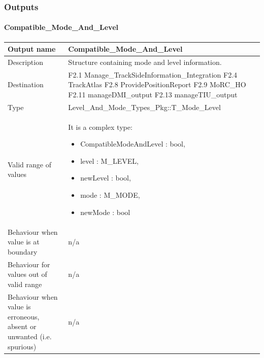 \subsubsection{Outputs}\label{s:mode_and_level_outputs}




\paragraph{Compatible\_Mode\_And\_Level}

\begin{longtable}{p{}p{}}
\toprule
Output name				& Compatible\_Mode\_And\_Level \\
\midrule
Description				& Structure containing mode and level information.  \\
\midrule
Destination				& F2.1 Manage\_TrackSideInformation\_Integration\newline
F2.4 TrackAtlas\newline
F2.8 ProvidePositionReport\newline
F2.9 MoRC\_HO\newline
F2.11 manageDMI\_output\newline 
F2.13 manageTIU\_output \\ 
\midrule
Type					& Level\_And\_Mode\_Types\_Pkg::T\_Mode\_Level \\
\midrule
Valid range of values	& It is a complex type: 
\begin{itemize}
\item CompatibleModeAndLevel : bool,
\item level : M\_LEVEL,
\item newLevel : bool,
\item mode : M\_MODE, 
\item newMode : bool
\end{itemize} \\
\midrule
Behaviour when value is at boundary	& n/a \\ 
\midrule
Behaviour for values out of valid range	& n/a \\ 
\midrule
Behaviour when value is erroneous, absent or unwanted (i.e. spurious) & n/a \\
\bottomrule
\end{longtable}

